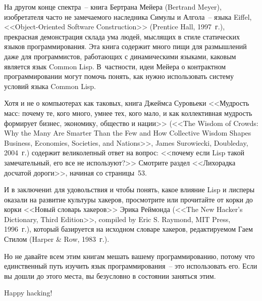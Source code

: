 На другом конце спектра~-- книга Бертрана Мейера (Bertrand Meyer), изобретателя часто не
замечаемого наследника Симулы и Алгола~-- языка Eiffel, <<Object-Oriented Software
Construction>> (Prentice Hall, 1997~г.), прекрасная демонстрация склада ума людей, мыслящих в
стиле статических языков программирования. Эта книга содержит много пищи для размышлений
даже для программистов, работающих с динамическими языками, каковым является язык Common
Lisp.  В~частности, идеи Мейера о контрактном программировании могут помочь понять, как
нужно использовать систему условий языка Common Lisp.

Хотя и не о компьютерах как таковых, книга Джеймса Суровьеки <<Мудрость масс: почему те,
кого много, умнее тех, кого мало, и как коллективная мудрость формирует бизнес, экономику,
общество и нации>> (<<The Wisdom of Crowds: Why the Many Are Smarter Than the Few and How
Collective Wisdom Shapes Business, Economies, Societies, and Nations>>, James Surowiecki,
Doubleday, 2004~г.) содержит великолепный ответ на вопрос: <<почему если Lisp такой
замечательный, его все не используют?>> Смотрите раздел <<Лихорадка досчатой дороги>>,
начиная со страницы~53.

И в заключениt для удовольствия и чтобы понять, какое влияние Lisp и лисперы оказали на
развитие культуры хакеров, просмотрите или прочитайте от корки до корки <<Новый словарь
хакеров>> Эрика Реймонда (<<The New Hacker's Dictionary, Third Edition>>, compiled by Eric
S. Raymond, MIT Press, 1996~г.), который базируется на исходном словаре хакеров, редактируемом
Гаем Стилом (Harper \& Row, 1983~г.).

Но не давайте всем этим книгам мешать вашему программированию, потому что единственный
путь изучить язык программирования~-- это использовать его. Если вы дошли до этого места,
вы безусловно в состоянии заняться этим.  

\vspace{0.5cm}

Happy hacking!


